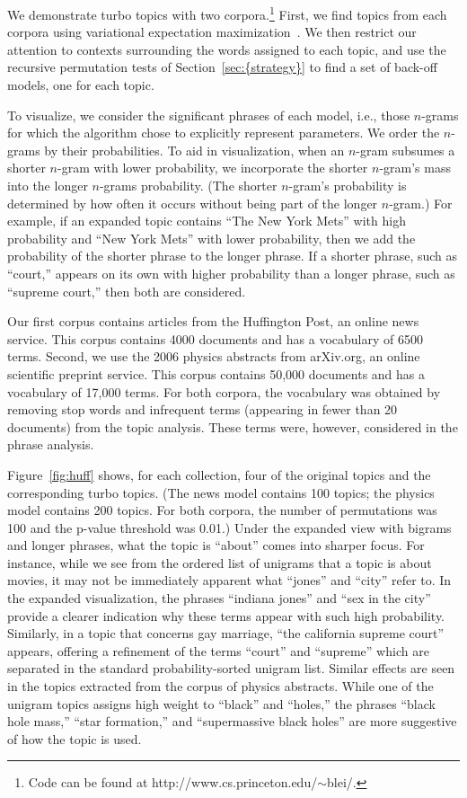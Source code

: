 \documentclass[11pt]{article}
\begin{document}
We demonstrate turbo topics with two corpora.\footnote{Code can be
  found at http://www.cs.princeton.edu/$\sim$blei/.}  First, we find
topics from each corpora using variational expectation
maximization~\cite{Blei:2003b}.  We then restrict our attention to
contexts surrounding the words assigned to each topic, and use the
recursive permutation tests of {Section~\ref{sec:{strategy}}} to find a set of
back-off models, one for each topic.

To visualize, we consider the significant phrases of each model, i.e.,
those $n$-grams for which the algorithm chose to explicitly represent
parameters.  We order the $n$-grams by their probabilities.  To aid in
visualization, when an $n$-gram subsumes a shorter $n$-gram with lower
probability, we incorporate the shorter $n$-gram's mass into the
longer $n$-grams probability.  (The shorter $n$-gram's probability is
determined by how often it occurs without being part of the longer
$n$-gram.)  For example, if an expanded topic contains ``The New York
Mets'' with high probability and ``New York Mets'' with lower
probability, then we add the probability of the shorter phrase to the
longer phrase.  If a shorter phrase, such as ``court,'' appears on its
own with higher probability than a longer phrase, such as ``supreme
court,'' then both are considered.

Our first corpus contains articles from the Huffington Post, an online
news service.  This corpus contains 4000 documents and has a
vocabulary of 6500 terms.  Second, we use the 2006 physics abstracts
from arXiv.org, an online scientific preprint service.  This corpus
contains 50,000 documents and has a vocabulary of 17,000 terms.  For
both corpora, the vocabulary was obtained by removing stop words and
infrequent terms (appearing in fewer than 20 documents) from the topic
analysis.  These terms were, however, considered in the phrase
analysis.

Figure~\ref{fig:huff} shows, for each collection, four of the original
topics and the corresponding turbo topics.  (The news model contains
100 topics; the physics model contains 200 topics.  For both corpora,
the number of permutations was 100 and the p-value threshold was
0.01.)  Under the expanded view with bigrams and longer phrases, what
the topic is ``about'' comes into sharper focus.  For instance, while
we see from the ordered list of unigrams that a topic is about movies,
it may not be immediately apparent what ``jones'' and ``city'' refer
to.  In the expanded visualization, the phrases ``indiana jones'' and
``sex in the city'' provide a clearer indication why these terms
appear with such high probability.  Similarly, in a topic that
concerns gay marriage, ``the california supreme court'' appears,
offering a refinement of the terms ``court'' and ``supreme'' which are
separated in the standard probability-sorted unigram list.  Similar
effects are seen in the topics extracted from the corpus of physics
abstracts.  While one of the unigram topics assigns high weight to
``black'' and ``holes,'' the phrases ``black hole mass,'' ``star
formation,'' and ``supermassive black holes'' are more suggestive of
how the topic is used.
\end{document}
